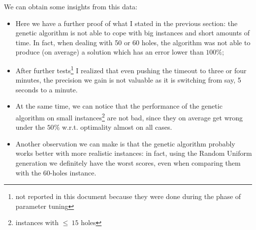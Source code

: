 We can obtain some insights from this data:

\begin{itemize}
\item Here we have a further proof of what I stated in the previous section:
  the genetic algorithm is not able to cope with big instances and short
  amounts of time. In fact, when dealing with 50 or 60 holes, the algorithm
  was not able to produce (on average) a solution which has an error lower
  than $100\%$;

\item After further tests\footnote{not reported in this document because they
  were done during the phase of parameter tuning} I realized that even pushing
  the timeout to three or four minutes, the precision we gain is not valuable
  as it is switching from say, 5 seconds to a minute.

\item At the same time, we can notice that the performance of the genetic
  algorithm on small instances\footnote{instances with $\leq\ 15$ holes} are
  not bad, since they on average get wrong under the $50\%$ w.r.t. optimality
  almost on all cases.

\item Another observation we can make is that the genetic algorithm probably
  works better with more realistic instances: in fact, using the Random Uniform
  generation we definitely have the worst scores, even when comparing them with
  the 60-holes instance.
\end{itemize}
